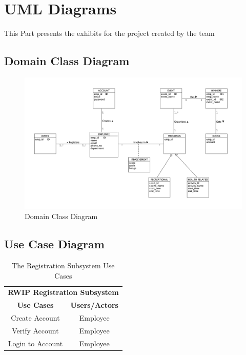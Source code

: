 \chapter{UML Diagrams}

This Part presents the exhibits for the project created by the team

\section{Domain Class Diagram}

\begin{figure}[h!t]
    \centering
    \includegraphics[width=\textwidth]{images/domainClass.png}
    \caption{Domain Class Diagram}
    \label{fig:domainClass}
\end{figure}

\FloatBarrier

\section{Use Case Diagram}

\begin{table}[h!t]
\caption{The Registration Subsystem Use Cases}
{%
\newcommand{\mc}[2]{\multicolumn{#1}{#2}}
\begin{center}
\begin{tabular}{|c|c|}
\hline
\multicolumn{2}{|c|}{\textbf{RWIP Registration Subsystem}} \\ \cline{1-2}
\textbf{Use Cases} & \textbf{Users/Actors} \\
\hline
\rule{0pt}{24pt}  Create Account & Employee \\
\hline
\rule{0pt}{24pt}  Verify Account & Employee \\
\hline
\rule{0pt}{24pt}  Login to Account & Employee \\
\hline
\end{tabular}
\end{center}
}%
\label{tab:reg}
\end{table}


